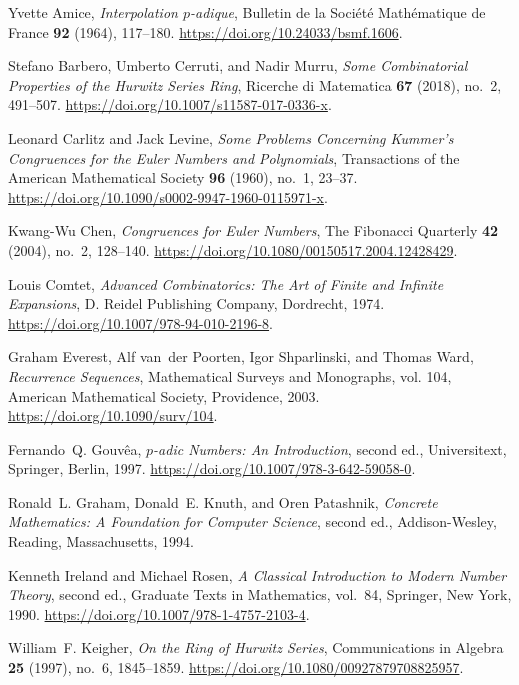 Yvette Amice, \emph{{Interpolation {$p$}-adique}}, Bulletin de la Soci\'et\'e
  Math\'ematique de France \textbf{92} (1964), 117--180.
\url{https://doi.org/10.24033/bsmf.1606}.

Stefano Barbero, Umberto Cerruti, and Nadir Murru, \emph{{Some Combinatorial
  Properties of the Hurwitz Series Ring}}, Ricerche di Matematica \textbf{67}
  (2018), no.~2, 491--507.
\url{https://doi.org/10.1007/s11587-017-0336-x}.

Leonard Carlitz and Jack Levine, \emph{{Some Problems Concerning Kummer's
  Congruences for the Euler Numbers and Polynomials}}, Transactions of the
  American Mathematical Society \textbf{96} (1960), no.~1, 23--37.
\url{https://doi.org/10.1090/s0002-9947-1960-0115971-x}.

Kwang-Wu Chen, \emph{{Congruences for Euler Numbers}}, The Fibonacci Quarterly
  \textbf{42} (2004), no.~2, 128--140.
\url{https://doi.org/10.1080/00150517.2004.12428429}.

Louis Comtet, \emph{{Advanced Combinatorics: The Art of Finite and Infinite
  Expansions}}, D. Reidel Publishing Company, Dordrecht, 1974.
\url{https://doi.org/10.1007/978-94-010-2196-8}.

Graham Everest, Alf van~der Poorten, Igor Shparlinski, and Thomas Ward,
  \emph{{Recurrence Sequences}}, Mathematical Surveys and Monographs, vol. 104,
  American Mathematical Society, Providence, 2003.
\url{https://doi.org/10.1090/surv/104}.

Fernando~Q. Gouv\^ea, \emph{{{$p$}-adic Numbers: An Introduction}}, second ed.,
  Universitext, Springer, Berlin, 1997.
\url{https://doi.org/10.1007/978-3-642-59058-0}.

Ronald~L. Graham, Donald~E. Knuth, and Oren Patashnik, \emph{{Concrete
  Mathematics: A Foundation for Computer Science}}, second ed., Addison-Wesley,
  Reading, Massachusetts, 1994.

Kenneth Ireland and Michael Rosen, \emph{{A Classical Introduction to Modern
  Number Theory}}, second ed., Graduate Texts in Mathematics, vol.~84,
  Springer, New York, 1990.
\url{https://doi.org/10.1007/978-1-4757-2103-4}.

William~F. Keigher, \emph{{On the Ring of Hurwitz Series}}, Communications in
  Algebra \textbf{25} (1997), no.~6, 1845--1859.
\url{https://doi.org/10.1080/00927879708825957}.

